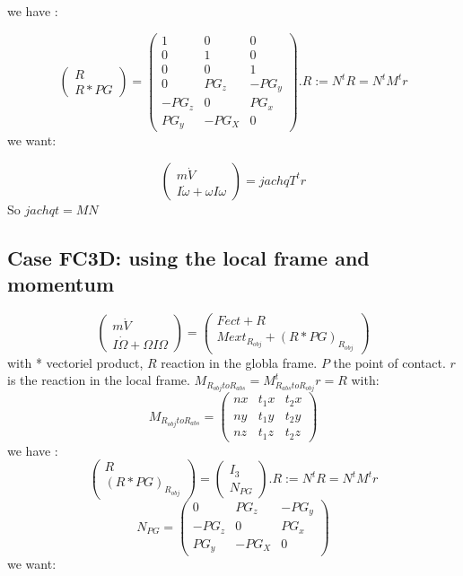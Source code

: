   we have :
  
  \[\left(\begin{array}{c}R\\R*PG\end{array}\right)=\left(\begin{array}{ccc} 1&0&0\\0&1&0\\0&0&1\\
      0&PG_z&-PG_y\\-PG_z&0&PG_x\\PG_y&-PG_X&0\end{array}\right).R:=N^tR=N^tM^tr\]
      we want:
      
\[\left(\begin{array}{c}m \dot V\\I \dot \omega + \omega I \omega \end{array}\right)=jachqT^t r\]
So $jachqt=MN$

\subsection{Case FC3D: using the local frame and momentum}

\[\left(\begin{array}{c}m \dot V\\I \dot \Omega + \Omega I \Omega \end{array}\right)= \left(\begin{array}{c}Fect+R\\Mext _{R_{obj}} + (R*PG) _{R_{obj}} \end{array}\right)\]
  with * vectoriel product, $R$ reaction in the globla frame. $P$ the point of contact.
  $r$ is the reaction in the local frame.  $M_{R_{obj}toR_{abs}}=M_{R_{abs}toR_{obj}}^t r=R$ with:
  \[M_{R_{obj}toR_{abs}}=\left(\begin{array}{ccc} nx&t_1x&t_2x \\ny&t_1y&t_2y\\nz&t_1z&t_2z \end{array}\right)\]
  we have :
  \[\left(\begin{array}{c}R\\(R*PG) _{R_{obj}}\end{array}\right)=\left(\begin{array}{c} I_3\\N_{PG}\end{array}\right).R:=N^tR=N^tM^tr\]
  \[ N_{PG}=\left(\begin{array}{ccc} 0&PG_z&-PG_y\\-PG_z&0&PG_x\\PG_y&-PG_X&0\end{array}\right)\]
      we want:
      
